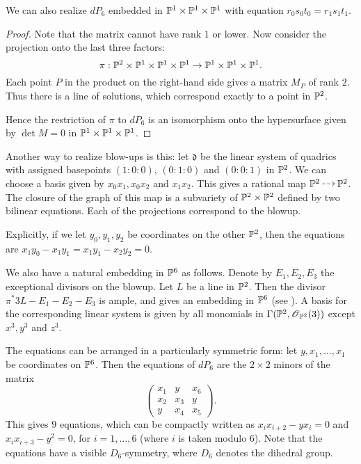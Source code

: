 \begin{lemma}
We can also realize $dP_6$ embedded in $\mathbb{P}^1 \times \mathbb{P}^1 \times \mathbb{P}^1$ with equation $r_0s_0t_0=r_1s_1t_1$.
\end{lemma}
\begin{proof}
Note that the matrix cannot have rank $1$ or lower. Now consider the projection onto the last three factors:
$$
\pi:\mathbb{P}^2 \times \mathbb{P}^1 \times \mathbb{P}^1 \times \mathbb{P}^1 \to \mathbb{P}^1 \times \mathbb{P}^1 \times \mathbb{P}^1.
$$
Each point $P$ in the product on the right-hand side gives a matrix $M_P$ of rank $2$. Thus there is a line of solutions, which correspond exactly to a point in $\mathbb{P}^2$.

Hence the restriction of $\pi$ to $dP_6$ is an isomorphism onto the hypersurface given by $\det M=0$ in $\mathbb{P}^1 \times \mathbb{P}^1 \times \mathbb{P}^1$. 
\end{proof}

Another way to realize blow-ups is this: let $\mathfrak d$ be the linear system of quadrics with assigned basepoints $(1:0:0)$, $(0:1:0)$ and $(0:0:1)$ in $\mathbb{P}^2$. We can choose a basis given by $x_0x_1,x_0x_2$ and $x_1x_2$. This gives a rational map $\PP^2 \rmap \PP^2$. The closure of the graph of this map is a subvariety of $\mathbb{P}^2 \times \mathbb{P}^2$ defined by two bilinear equations. Each of the projections correspond to the blowup.

Explicitly, if we let $y_0,y_1,y_2$ be coordinates on the other $\mathbb{P}^2$, then the equations are $x_1y_0-x_1y_1=x_1y_1-x_2y_2=0$.

We also have a natural embedding in $\mathbb{P}^6$ as follows. Denote by $E_1, E_2, E_3$ the exceptional divisors on the blowup. Let $L$ be a line in $\mathbb{P}^2$. Then the divisor $\pi^\ast 3L - E_1-E_2-E_3$ is ample, and gives an embedding in $\mathbb{P}^6$ (see \cite[Chapter V, Theorem 4.6]{hartshorne}). A basis for the corresponding linear system is given by all monomials in $\Gamma(\mathbb{P}^2,\operatorname{\mathscr{O}}_{\mathbb{P}^2}(3))$ except $x^3,y^3$ and $z^3$. 

The equations can be arranged in a particularly symmetric form: let $y,x_1,\ldots,x_1$ be coordinates on $\mathbb{P}^6$. Then the equations of $dP_6$ are the $2 \times 2$ minors of the matrix
$$
\begin{pmatrix}
x_1 & y & x_6 \\
x_2 & x_3 & y \\
y & x_4 & x_5
\end{pmatrix}.
$$
This gives $9$ equations, which can be compactly written as $x_ix_{i+2}-yx_i=0$ and $x_ix_{i+3}-y^2=0$, for $i=1,\ldots,6$ (where $i$ is taken modulo $6$). Note that the equations have a visible $D_6$-symmetry, where $D_6$ denotes the dihedral group.

